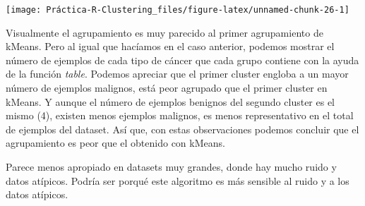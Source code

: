 \documentclass[]{article}
\begin{document}
\begin{center}\texttt{[image: Práctica-R-Clustering\_files/figure-latex/unnamed-chunk-26-1]} \end{center}

Visualmente el agrupamiento es muy parecido al primer agrupamiento de
kMeans. Pero al igual que hacíamos en el caso anterior, podemos mostrar
el número de ejemplos de cada tipo de cáncer que cada grupo contiene con
la ayuda de la función \emph{table}. Podemos apreciar que el primer
cluster engloba a un mayor número de ejemplos malignos, está peor
agrupado que el primer cluster en kMeans. Y aunque el número de ejemplos
benignos del segundo cluster es el mismo (4), existen menos ejemplos
malignos, es menos representativo en el total de ejemplos del dataset.
Así que, con estas observaciones podemos concluir que el agrupamiento es
peor que el obtenido con kMeans.

Parece menos apropiado en datasets muy grandes, donde hay mucho ruido y
datos atípicos. Podría ser porqué este algoritmo es más sensible al
ruido y a los datos atípicos.
\end{document}
